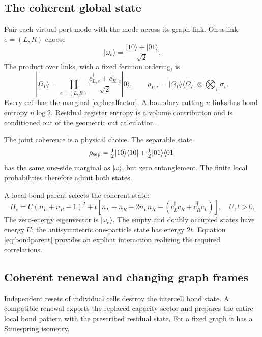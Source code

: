 \subsection{The coherent global state}

Pair each virtual port mode with the mode across its graph link. On a link $e=(L,R)$ choose
\begin{equation}
|\omega_e\rangle=\frac{|10\rangle+|01\rangle}{\sqrt2}.
\end{equation}
The product over links, with a fixed fermion ordering, is
\begin{equation}
|\Omega_\Gamma\rangle=
\prod_{e=(L,R)}
\frac{c^\dagger_{L,e}+c^\dagger_{R,e}}{\sqrt2}|0\rangle,
\qquad
\rho_{\Gamma,*}=|\Omega_\Gamma\rangle\langle\Omega_\Gamma|
\otimes\bigotimes_v\sigma_v.
\end{equation}
Every cell has the marginal \eqref{eq:localfactor}. A boundary cutting $n$ links has bond entropy $n\log2$. Residual register entropy is a volume contribution and is conditioned out of the geometric cut calculation.

The joint coherence is a physical choice. The separable state
\begin{equation}
\rho_{\rm sep}=\tfrac12|10\rangle\langle10|
+\tfrac12|01\rangle\langle01|
\end{equation}
has the same one-side marginal as $|\omega\rangle$, but zero entanglement. The finite local probabilities therefore admit both states.

A local bond parent selects the coherent state:
\begin{equation}
H_e=U(n_L+n_R-1)^2
+t\left[n_L+n_R-2n_Ln_R
-(c_L^\dagger c_R+c_R^\dagger c_L)\right],
\quad U,t>0.
\label{eq:bondparent}
\end{equation}
The zero-energy eigenvector is $|\omega_e\rangle$. The empty and doubly occupied states have energy $U$; the antisymmetric one-particle state has energy $2t$. Equation \eqref{eq:bondparent} provides an explicit interaction realizing the required correlations.

\subsection{Coherent renewal and changing graph frames}

Independent resets of individual cells destroy the intercell bond state. A compatible renewal exports the replaced capacity sector and prepares the entire local bond pattern with the prescribed residual state. For a fixed graph it has a Stinespring isometry.

